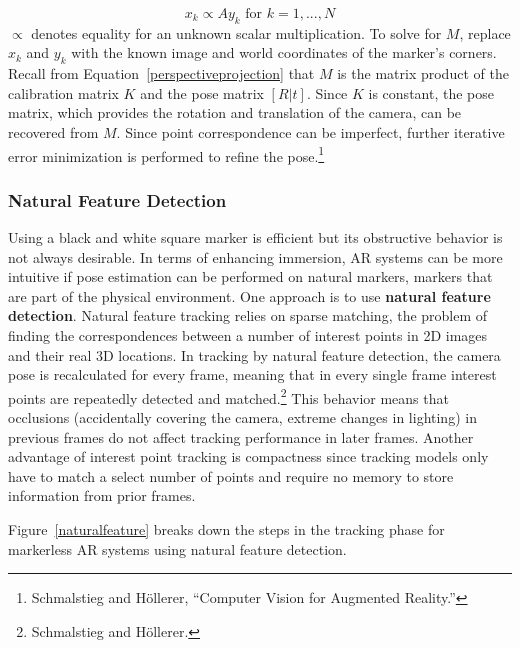 \begin{equation}\label{dlt}
x_k \propto Ay_k \text{ for } k = 1,...,N
\end{equation}
$\propto$ denotes equality for an unknown scalar multiplication. To solve for $M$, replace $x_k$ and $y_k$ with the known image and world coordinates of the marker's corners. Recall from Equation~\ref{perspectiveprojection} that $M$ is the matrix product of the calibration matrix $K$ and the pose matrix $[R|t]$. Since $K$ is constant, the pose matrix, which provides the rotation and translation of the camera, can be recovered from $M$. Since point correspondence can be imperfect, further iterative error minimization is performed to refine the pose.\footnote{Schmalstieg and Höllerer, “Computer Vision for Augmented Reality.”}

\subsubsection{Natural Feature Detection}
Using a black and white square marker is efficient but its obstructive behavior is not always desirable. In terms of enhancing immersion, AR systems can be more intuitive if pose estimation can be performed on natural markers, markers that are part of the physical environment. One approach is to use \textbf{natural feature detection}. Natural feature tracking relies on sparse matching, the problem of finding the correspondences between a number of interest points in 2D images and their real 3D locations. In tracking by natural feature detection, the camera pose is recalculated for every frame, meaning that in every single frame interest points are repeatedly detected and matched.\footnote{Schmalstieg and Höllerer.} This behavior means that occlusions (accidentally covering the camera, extreme changes in lighting) in previous frames do not affect tracking performance in later frames. Another advantage of interest point tracking is compactness since tracking models only have to match a select number of points and require no memory to store information from prior frames.

Figure~\ref{naturalfeature} breaks down the steps in the tracking phase for markerless AR systems using natural feature detection.

